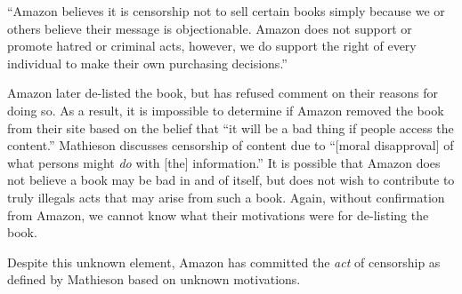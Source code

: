 \documentclass[11pt]{article}
\begin{document}
\begin{multicols}{2}
``Amazon believes it is censorship not to sell certain books simply because we or others believe their message is objectionable.  Amazon does not support or promote hatred or criminal acts, however, we do support the right of every individual to make their own purchasing decisions.'' \cite{TechCrunchAmazonCensorship}

Amazon later de-listed the book, but has refused comment on their reasons for doing so.  As a result, it is impossible to determine if Amazon removed the book from their site based on the belief that ``it will be a bad thing if people access the content.''  Mathieson discusses censorship of content due to ``[moral disapproval] of what persons might \emph{do} with [the] information.'' \cite{MathiesenCensorship}  It is possible that Amazon does not believe a book may be bad in and of itself, but does not wish to contribute to truly illegals acts that may arise from such a book.  Again, without confirmation from Amazon, we cannot know what their motivations were for de-listing the book.

Despite this unknown element, Amazon has committed the \emph{act} of censorship as defined by Mathieson based on unknown motivations.



\end{multicols}
\end{document}
